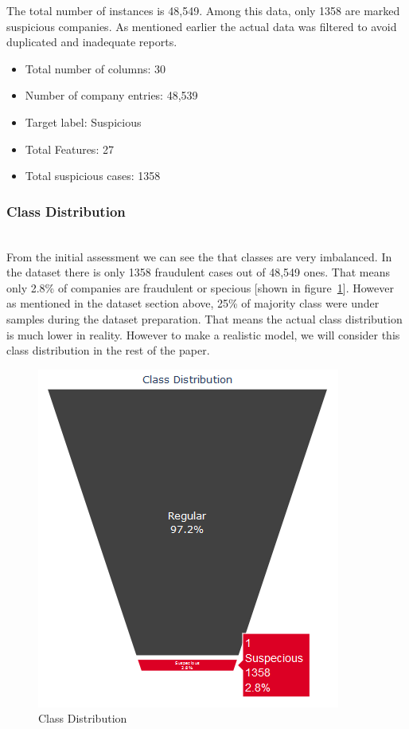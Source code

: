 The total number of instances is 48,549. Among this data, only 1358 are marked suspicious companies. As mentioned earlier the actual data was filtered to avoid duplicated and inadequate reports. 
\begin{itemize}
    \item Total number of columns: 30
    \item Number of company entries: 48,539
    \item Target label: Suspicious
    \item Total Features: 27
    \item Total suspicious cases: 1358
\end{itemize}


\subsubsection{Class Distribution}\hspace*{\fill} \\
From the initial assessment we can see the that classes are very imbalanced. In the dataset there is only 1358 fraudulent cases out of 48,549 ones. That means only 2.8\% of companies are fraudulent or specious [shown in figure~\ref{fig:class distribution}]. However as mentioned in the dataset section above, 25\% of majority class were under samples during the dataset preparation. That means the actual class distribution is much lower in reality. However to make a realistic model, we will consider this class distribution in the rest of the paper. 

\begin{figure}[H]
    \centering
    \includegraphics[width=.8\linewidth]{figures/class_imbalance.png}
    \caption{Class Distribution}
    \label{fig:class distribution}
\end{figure}

